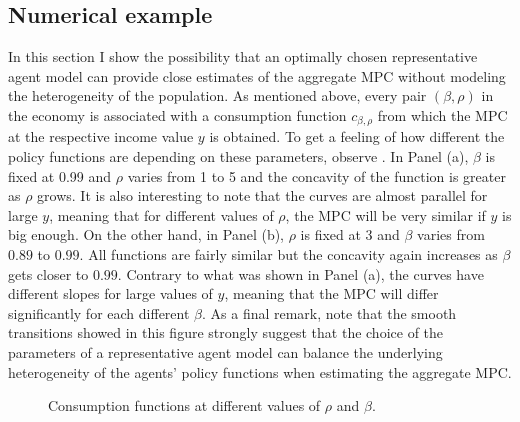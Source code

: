 \documentclass[english, a4paper,12pt]{article}
\begin{document}
\subsection{Numerical example}
In this section I show the possibility that an optimally chosen representative agent model can provide close estimates of the aggregate MPC without modeling the heterogeneity of the population. As mentioned above, every pair $(\beta,\rho)$ in the economy is associated with a consumption function $c_{\beta,\rho}$ from which the MPC at the respective income value $y$ is obtained. To get a feeling of how different the policy functions are depending on these parameters, observe . In Panel (a), $\beta$ is fixed at 0.99 and $\rho$ varies from 1 to 5 and the concavity of the function is greater as $\rho$ grows. It is also interesting to note that the curves are almost parallel for large $y$, meaning that for different values of $\rho$, the MPC will be very similar if $y$ is big enough. On the other hand, in Panel (b), $\rho$ is fixed at 3 and $\beta$ varies from $0.89$ to $0.99$. All functions are fairly similar but the concavity again increases as $\beta$ gets closer to $0.99$. Contrary to what was shown in Panel (a), the curves have different slopes for large values of $y$, meaning that the MPC will differ significantly for each different $\beta$. As a final remark, note that the smooth transitions showed in this figure strongly suggest that the choice of the parameters of a representative agent model can balance the underlying heterogeneity of the agents' policy functions when estimating the aggregate MPC.
	\begin{figure}[H]
		\caption{Consumption functions at different values of $\rho$ and $\beta$.} \label{fig:ConsRhoBeta}
		
		
	\end{figure}
\end{document}
